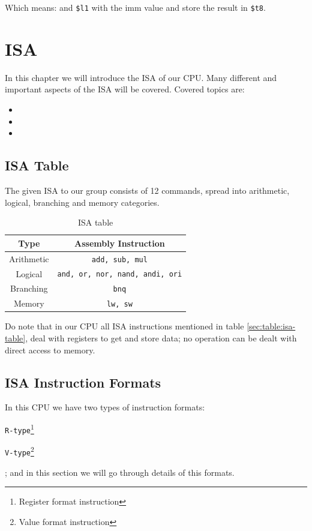 \documentclass[12pt, dvipsnames, svgnames, x11names, oneside]{book}
\newenvironment{sansserif}{\sffamily}{\normalfont}
\begin{document}
Which means: and \texttt{\$l1} with the imm value and store the result in \texttt{\$t8}.

\chapter{ISA}\label{ch:isa}
\begin{sansserif}
In this chapter we will introduce the ISA of our CPU. Many different and important aspects of the ISA will be covered. Covered topics are:
\begin{itemize}
\item {}
\item {}
\item {}
\end{itemize}
\end{sansserif}

\section{ISA Table}\label{sec:isa-table}
The given ISA to our group consists of 12 commands, spread into arithmetic, logical, branching and memory categories.

\begin{table}[hb]
\caption{ISA table}
\begin{center}
\begin{tabular}{|c|c|}
\hline
Type & Assembly Instruction \\
\hline
\hline
Arithmetic & \texttt{add, sub, mul} \\
\hline
Logical & \texttt{and, or, nor, nand, andi, ori} \\
\hline
Branching & \texttt{bnq} \\
\hline
Memory & \texttt{lw, sw} \\
\hline
\end{tabular}
\end{center}
\end{table}\label{sec:table:isa-table}

Do note that in our CPU all ISA instructions mentioned in table \ref{sec:table:isa-table}, deal with registers to get and store data; no operation can be dealt with direct access to memory.

\section{ISA Instruction Formats}\label{sec:isa-insts}
In this CPU we have two types of instruction formats: 
\begin{enumerate*}
\item \texttt{R-type}\footnote{Register format instruction}
\item \texttt{V-type}\footnote{Value format instruction}
\end{enumerate*}; and in this section we will go through details of this formats. \\
\end{document}
